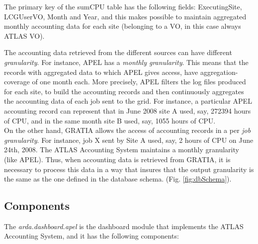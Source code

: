 The primary key of the sumCPU table has the following fields:
ExecutingSite,
LCGUserVO,
Month and
Year,
and this makes possible to maintain aggregated
monthly accounting data for each site
(belonging to a VO, in this case always ATLAS VO).


The accounting data retrieved from the different sources can have
different {\itshape granularity}.
For instance, APEL has a {\itshape monthly granularity}.
This means that the records with aggregated data to which APEL gives
access, have aggregation-coverage of one month each.
More precisely, APEL filters the log files produced for each site,
to build the accounting records and then continuously aggregates the
accounting data of each job sent to the grid.
For instance, a particular APEL accounting record can represent
that in June 2008 site A used, say, 272394 hours of CPU,
and in the same month site B used, say, 1055 hours of CPU.\\
On the other hand, GRATIA allows the access of accounting records in
a per {\itshape job granularity}.
For instance, job X sent by Site A used, say, 2 hours of CPU on
June 24th, 2008.
The ATLAS Accounting System maintains a monthly granularity (like
APEL).
Thus, when accounting data is retrieved from GRATIA, it is necessary
to process this data in a way that insures that the output granularity
is the same as the one defined in the database schema.
(Fig. \ref{fig:dbSchema}).


\subsection{Components}
The {\itshape arda.dashboard.apel} is the dashboard module that
implements the ATLAS Accounting System, and it has the following
components:

